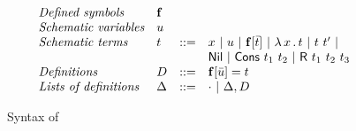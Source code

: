 \documentclass{article}
\begin{document}
\begin{figure}
  \[
  \begin{array}{llll}
   \textit{Defined symbols} & \mathbf{f} & \ &\ \\
   \textit{Schematic variables} & u & \ &\ \\
    \textit{Schematic terms} & t & ::= & x\ |\ u\ |\ \mathbf{f}[\bar{t}]\ |\ \lam{x}{t}\ |\ t\ t'\ |\\
    \ &\ &\ & \mathsf{Nil}\ |\ \mathsf{Cons}\ t_1\ t_2\ |\ \mathsf{R}\ t_1\ t_2\ t_3 \\
    \textit{Definitions} & D & ::= & \mathbf{f}[\bar{u}] = t \\
    \textit{Lists of definitions} & \Delta & ::= & \cdot \ |\ \Delta, D
  \end{array}
  \]
  \caption{Syntax of \sar}
\label{fig:sarsyn}
\end{figure}
\end{document}
